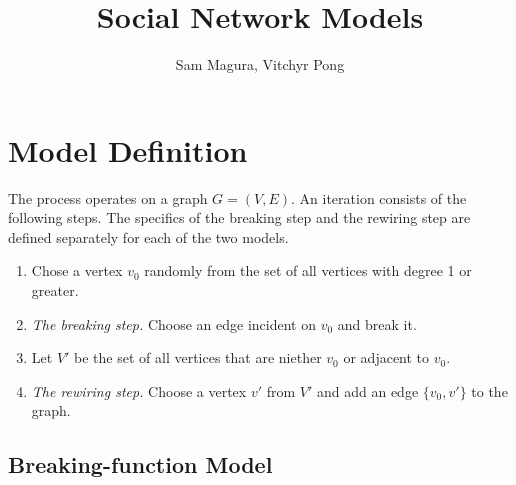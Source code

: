 \documentclass[a4paper,10pt]{article}
\title{Social Network Models}
\author{Sam Magura, Vitchyr Pong}
\begin{document}
\maketitle



\section{Model Definition}

The process operates on a graph $G = (V, E)$. An iteration consists of the following steps. The specifics of the breaking step and the rewiring step are defined separately for each of the two models.

\begin{enumerate}
 \item Chose a vertex $v_0$ randomly from the set of all vertices with degree 1 or greater. 
 \item \emph{The breaking step.} Choose an edge incident on $v_0$ and break it. 
 \item Let $V'$ be the set of all vertices that are niether $v_0$ or adjacent to $v_0$.
 \item \emph{The rewiring step.} Choose a vertex $v'$ from $V'$ and add an edge $\{v_0, v'\}$ to the graph.

\end{enumerate}

\subsection{Breaking-function Model}
\end{document}
